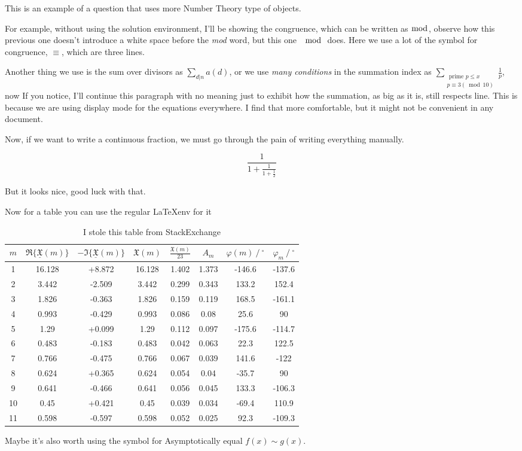 This is an example of a question that uses more Number Theory type of objects.

For example, without using the solution environment, I'll be showing the congruence, which can be written as $\bmod$, observe how this previous one doesn't introduce a white space before the \emph{mod} word, but this one $\mod$ does. Here we use a lot of the symbol for congruence, $\equiv$, which are three lines.

Another thing we use is the sum over divisors as $\sum_{d | n} a(d)$, or we use \emph{many conditions} in the summation index as $\sum_{ \substack{\text { prime } p \leq x \\ p \equiv 3(\bmod 10)} } \frac{1}{p}$, now If you notice, I'll continue this paragraph with no meaning just to exhibit how the summation, as big as it is, still respects line. This is because we are using display mode for the equations everywhere. I find that more comfortable, but it might not be convenient in any document.

Now, if we want to write a continuous fraction, we must go through the pain of writing everything manually.

$$
\frac{1}{1 + \frac{1}{1 + \frac{1}{2}}}
$$

But it looks nice, good luck with that.

Now for a table you can use the regular \LaTeX env for it


\begin{table}[h]
\centering
\begin{tabular}{cccccccc} \toprule
    {$m$} & {$\Re\{\underline{\mathfrak{X}}(m)\}$} & {$-\Im\{\underline{\mathfrak{X}}(m)\}$} & {$\mathfrak{X}(m)$} & {$\frac{\mathfrak{X}(m)}{23}$} & {$A_m$} & {$\varphi(m)\ /\ ^{\circ}$} & {$\varphi_m\ /\ ^{\circ}$} \\ \midrule
    1  & 16.128 & +8.872 & 16.128 & 1.402 & 1.373 & -146.6 & -137.6 \\
    2  & 3.442  & -2.509 & 3.442  & 0.299 & 0.343 & 133.2  & 152.4  \\
    3  & 1.826  & -0.363 & 1.826  & 0.159 & 0.119 & 168.5  & -161.1 \\
    4  & 0.993  & -0.429 & 0.993  & 0.086 & 0.08  & 25.6   & 90     \\ \midrule
    5  & 1.29   & +0.099 & 1.29   & 0.112 & 0.097 & -175.6 & -114.7 \\
    6  & 0.483  & -0.183 & 0.483  & 0.042 & 0.063 & 22.3   & 122.5  \\
    7  & 0.766  & -0.475 & 0.766  & 0.067 & 0.039 & 141.6  & -122   \\
    8  & 0.624  & +0.365 & 0.624  & 0.054 & 0.04  & -35.7  & 90     \\ \midrule
    9  & 0.641  & -0.466 & 0.641  & 0.056 & 0.045 & 133.3  & -106.3 \\
    10 & 0.45   & +0.421 & 0.45   & 0.039 & 0.034 & -69.4  & 110.9  \\
    11 & 0.598  & -0.597 & 0.598  & 0.052 & 0.025 & 92.3   & -109.3 \\ \bottomrule
\end{tabular}
\caption{
I stole this table from StackExchange\protect\footnotemark
}
\end{table}


Maybe it's also worth using the symbol for Asymptotically equal $f(x) \sim g(x)$.
